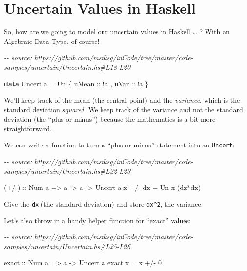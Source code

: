 \documentclass[]{article}
\newenvironment{Shaded}{}{}
\newcommand{\CommentTok}[1]{\textcolor[rgb]{0.38,0.63,0.69}{\textit{#1}}}
\newcommand{\DataTypeTok}[1]{\textcolor[rgb]{0.56,0.13,0.00}{#1}}
\newcommand{\DecValTok}[1]{\textcolor[rgb]{0.25,0.63,0.44}{#1}}
\newcommand{\KeywordTok}[1]{\textcolor[rgb]{0.00,0.44,0.13}{\textbf{#1}}}
\newcommand{\NormalTok}[1]{#1}
\newcommand{\OperatorTok}[1]{\textcolor[rgb]{0.40,0.40,0.40}{#1}}
\newcommand{\OtherTok}[1]{\textcolor[rgb]{0.00,0.44,0.13}{#1}}
\begin{document}
\hypertarget{uncertain-values-in-haskell}{%
\section{Uncertain Values in Haskell}\label{uncertain-values-in-haskell}}

So, how are we going to model our uncertain values in Haskell \ldots{} ? With an
Algebraic Data Type, of course!

\begin{Shaded}
\begin{Highlighting}[]
\CommentTok{{-}{-} source: https://github.com/mstksg/inCode/tree/master/code{-}samples/uncertain/Uncertain.hs\#L18{-}L20}

\KeywordTok{data} \DataTypeTok{Uncert}\NormalTok{ a }\OtherTok{=} \DataTypeTok{Un}\NormalTok{ \{}\OtherTok{ uMean ::} \OperatorTok{!}\NormalTok{a}
\NormalTok{                   ,}\OtherTok{ uVar  ::} \OperatorTok{!}\NormalTok{a}
\NormalTok{                   \}}
\end{Highlighting}
\end{Shaded}

We'll keep track of the mean (the central point) and the \emph{variance}, which
is the standard deviation \emph{squared}. We keep track of the variance and not
the standard deviation (the ``plus or minus'') because the mathematics is a bit
more straightforward.

We can write a function to turn a ``plus or minus'' statement into an
\texttt{Uncert}:

\begin{Shaded}
\begin{Highlighting}[]
\CommentTok{{-}{-} source: https://github.com/mstksg/inCode/tree/master/code{-}samples/uncertain/Uncertain.hs\#L22{-}L23}

\OtherTok{(+/{-}) ::} \DataTypeTok{Num}\NormalTok{ a }\OtherTok{=>}\NormalTok{ a }\OtherTok{{-}>}\NormalTok{ a }\OtherTok{{-}>} \DataTypeTok{Uncert}\NormalTok{ a}
\NormalTok{x }\OperatorTok{+/{-}}\NormalTok{ dx }\OtherTok{=} \DataTypeTok{Un}\NormalTok{ x (dx}\OperatorTok{*}\NormalTok{dx)}
\end{Highlighting}
\end{Shaded}

Give the \texttt{dx} (the standard deviation) and store \texttt{dx\^{}2}, the
variance.

Let's also throw in a handy helper function for ``exact'' values:

\begin{Shaded}
\begin{Highlighting}[]
\CommentTok{{-}{-} source: https://github.com/mstksg/inCode/tree/master/code{-}samples/uncertain/Uncertain.hs\#L25{-}L26}

\OtherTok{exact ::} \DataTypeTok{Num}\NormalTok{ a }\OtherTok{=>}\NormalTok{ a }\OtherTok{{-}>} \DataTypeTok{Uncert}\NormalTok{ a}
\NormalTok{exact x }\OtherTok{=}\NormalTok{ x }\OperatorTok{+/{-}} \DecValTok{0}
\end{Highlighting}
\end{Shaded}
\end{document}
